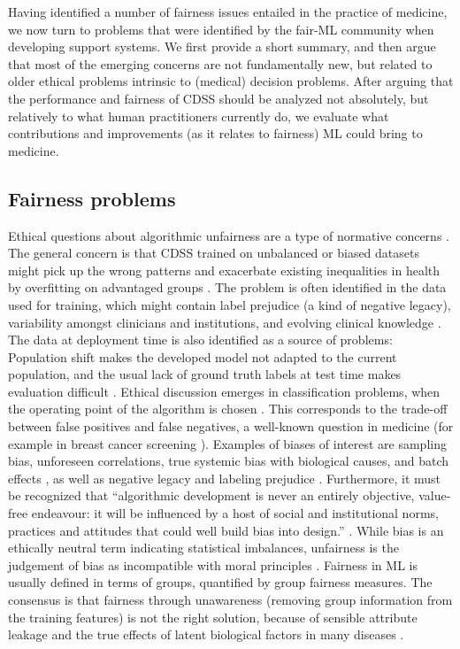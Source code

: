Having identified a number of fairness issues entailed in the practice of medicine, we now turn to problems that were identified by the fair-ML community when developing support systems.
We first provide a short summary, and then argue that most of the emerging concerns are not fundamentally new, but related to older ethical problems intrinsic to (medical) decision problems.
After arguing that the performance and fairness of CDSS should be analyzed not absolutely, but relatively to what human practitioners currently do,
we evaluate what contributions and improvements (as it relates to fairness) ML could bring to medicine. 


\subsection{Fairness problems}
    Ethical questions about algorithmic unfairness are a type of normative concerns \cite{Morley2020}.
    The general concern is that CDSS trained on unbalanced or biased datasets might pick up the wrong patterns and exacerbate existing inequalities in health by overfitting on advantaged groups \cite{Morley2020, Chen2021}.
    The problem is often identified in the data used for training, which might contain label prejudice (a kind of negative legacy), variability amongst clinicians and institutions, and evolving clinical knowledge \cite{Chen2021}.
    The data at deployment time is also identified as a source of problems: Population shift makes the developed model not adapted to the current population, and the usual lack of ground truth labels at test time makes evaluation difficult \cite{Chen2021}.
    Ethical discussion emerges in classification problems, when the operating point of the algorithm is chosen \cite{Fletcher2021}.
    This corresponds to the trade-off between false positives and false negatives, a well-known question in medicine (for example in breast cancer screening \cite{Fletcher2021}).
    Examples of biases of interest are sampling bias, unforeseen correlations, true systemic bias with biological causes, and batch effects \cite{Fletcher2021}, as well as negative legacy and labeling prejudice \cite{Chen2021}.
    Furthermore, it must be recognized that ``algorithmic development is never an entirely objective, value-free endeavour: it will be influenced by a host of social and institutional norms, practices and attitudes that could well build bias into design.'' \cite[p.~673]{Zerilli2019}.
    While bias is an ethically neutral term indicating statistical imbalances, unfairness is the judgement of bias as incompatible with moral principles \cite{Fletcher2021}.
    Fairness in ML is usually defined in terms of groups, quantified by group fairness measures.
    The consensus is that fairness through unawareness (removing group information from the training features) is not the right solution, because of sensible attribute leakage and the true effects of latent biological factors in many diseases \cite{Chen2021}.



